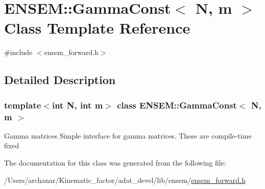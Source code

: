 \hypertarget{classENSEM_1_1GammaConst}{}\section{E\+N\+S\+EM\+:\+:Gamma\+Const$<$ N, m $>$ Class Template Reference}
\label{classENSEM_1_1GammaConst}


{\ttfamily \#include $<$ensem\+\_\+forward.\+h$>$}



\subsection{Detailed Description}
\subsubsection*{template$<$int N, int m$>$\newline
class E\+N\+S\+E\+M\+::\+Gamma\+Const$<$ N, m $>$}

Gamma matrices Simple interface for gamma matrices. These are compile-\/time fixed 

The documentation for this class was generated from the following file\+:\begin{DoxyCompactItemize}
\item 
/\+Users/archanar/\+Kinematic\+\_\+factor/adat\+\_\+devel/lib/ensem/\mbox{\hyperlink{lib_2ensem_2ensem__forward_8h}{ensem\+\_\+forward.\+h}}\end{DoxyCompactItemize}
